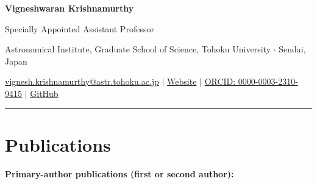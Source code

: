 \documentclass[10pt,a4paper]{article}
\begin{document}
\thispagestyle{empty}
{\fontsize{25}{28}\selectfont\sffamily\bfseries\color{navy} Vigneshwaran Krishnamurthy}\par
\vspace{2pt}
{\large\sffamily\color{teal}Specially Appointed Assistant Professor}\par
{\small Astronomical Institute, Graduate School of Science, Tohoku University $\cdot$ Sendai, Japan}\par
\vspace{4pt}
{\small\sffamily
\href{mailto:vignesh.krishnamurthy@astr.tohoku.ac.jp}{vignesh.krishnamurthy@astr.tohoku.ac.jp}
\quad$\vert$\quad
\href{https://vigneshastro.github.io/}{Website}
\quad$\vert$\quad
\href{https://orcid.org/0000-0003-2310-9415}{ORCID: 0000-0003-2310-9415}
\quad$\vert$\quad
\href{https://github.com/VigneshAstro}{GitHub}}
\vspace{5pt}
\color{rulegray}\hrule\color{black}
\vspace{2pt}
\section{Publications}

\textbf{Primary-author publications (first or second author):}
\end{document}
